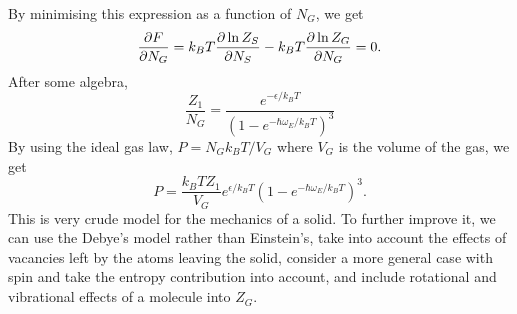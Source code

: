     By minimising this expression as a function of $N_G$, we get
    \begin{equation}
        \frac{\partial F}{\partial N_G} = k_BT\frac{\partial \ln Z_S}{\partial N_S}-k_BT\frac{\partial \ln Z_G}{\partial N_G}=0.
    \end{equation}
    After some algebra, 
    \begin{equation}
        \frac{Z_1}{N_G} = \frac{e^{-\epsilon/k_BT}}{(1-e^{-\hbar\omega_E/k_BT})^3}
    \end{equation}
    By using the ideal gas law, $P=N_Gk_BT/V_G$ where $V_G$ is the volume of the gas, we get
    \begin{equation}
        P = \frac{k_BTZ_1}{V_G}e^{\epsilon/k_BT}(1-e^{-\hbar\omega_E/k_BT})^3.
    \end{equation}
    This is very crude model for the mechanics of a solid. To further improve it, we can use the Debye's model rather than Einstein's, take into account the effects of vacancies left by the atoms leaving the solid, consider a more general case with spin and take the entropy contribution into account, and include rotational and vibrational effects of a molecule into $Z_G$. 